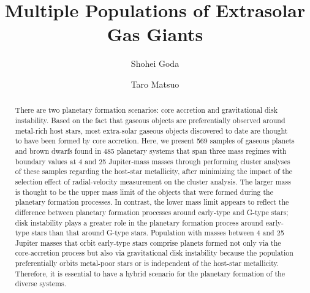 \documentclass[twocolumn]{aastex62}
\begin{document}
\begin{CJK*}{UTF8}{min}

\title{Multiple Populations of Extrasolar Gas Giants}

\author{Shohei Goda}

\author{Taro Matsuo}

\begin{abstract}

There are two planetary formation scenarios: core accretion and gravitational disk instability. Based on the fact that gaseous objects are preferentially observed around metal-rich host stars, most extra-solar gaseous objects discovered to date are thought to have been formed by core accretion. Here, we present 569 samples of gaseous planets and brown dwarfs found in 485 planetary systems that span three mass regimes with boundary values at 4 and 25 Jupiter-mass masses through performing cluster analyses of these samples regarding the host-star metallicity, after minimizing the impact of the selection effect of radial-velocity measurement on the cluster analysis. The larger mass is thought to be the upper mass limit of the objects that were formed during the planetary formation processes. In contrast, the lower mass limit appears to reflect the difference between planetary formation processes around early-type and G-type stars; disk instability plays a greater role in the planetary formation process around early-type stars than that around G-type stars. Population with masses between 4 and 25 Jupiter masses that orbit early-type stars comprise planets formed not only via the core-accretion process but also via gravitational disk instability because the population preferentially orbits metal-poor stars or is independent of the host-star metallicity. Therefore, it is essential to have a hybrid scenario for the planetary formation of the diverse systems.

\end{abstract}

\vspace{1cm}


\end{CJK*}
\end{document}
